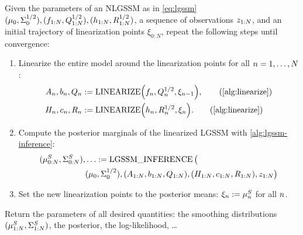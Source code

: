 \documentclass{mimosis}
\begin{document}
\begin{alg}
\setlength{\belowdisplayskip}{3pt}
\setlength{\belowdisplayshortskip}{2pt}
\setlength{\abovedisplayskip}{3pt}
\setlength{\abovedisplayshortskip}{-8pt}
\label{alg:ieks}
\label{alg:nlgssm-inference:global}
Given the parameters of an NLGSSM as in \cref{eq:lgssm}
\((\mu_{0}, \Sigma_{0}^{1/2}), (f_{1:N}, Q_{1:N}^{1/2}), (h_{1:N}, R_{1:N}^{1/2})\),
a sequence of observations \(z_{1:N}\),
and an initial trajectory of linearization points \(\xi_{0:N}\),
repeat the following steps until convergence:
\begin{enumerate}[nosep]
\item Linearize the entire model around the linearization points for all \(n = 1, \dots, N\):
\begin{align*}
  \transA_\idxt, \transb_\idxt, \transC_\idxt &:= \operatorname{LINEARIZE}\left(
    \transf_\idxt, \transC_\idxt^{1/2}, \xi_{\idxt-1}
  \right),
  \tag{\cref{alg:linearize}}\\
  \obsA_\idxt, \obsb_\idxt, \obsC_\idxt &:= \operatorname{LINEARIZE}\left(
    \obsh_\idxt, \obsC_\idxt^{1/2}, \xi_\idxt
  \right).
   \tag{\cref{alg:linearize}}
\end{align*}
\item Compute the posterior marginals of the linearized LGSSM with \cref{alg:lgssm-inference}:
\begin{equation*}
  \begin{split}
  (\mu_{{0:N}}^S , \Sigma_{{0:N}}^S), & \ldots := \operatorname{LGSSM\_INFERENCE}\big(\\
    &(\mu_{0}, \Sigma_{0}^{1/2}), (A_{1:N}, b_{1:N}, Q_{1:N}), (H_{1:N}, c_{1:N}, R_{1:N}), z_{1:N}
  \big)
  \end{split}
\end{equation*}
\item Set the new linearization points to the posterior means:
\(\xi_n := \mu_{n}^S\) for all \(n\).
\end{enumerate}
Return the parameters of all desired quantities:
the smoothing distributions \((\mu_{{1:N}}^S, \Sigma_{{1:N}}^S)\), the posterior, the log-likelihood, \ldots{}
\end{alg}
\end{document}
